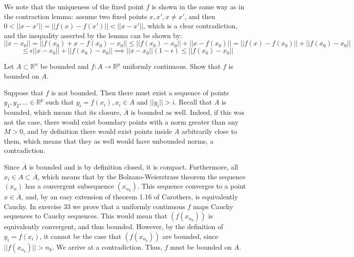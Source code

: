 \begin{solution}
    We note that the uniqueness of the fixed point $f$ is shown in the same way as in the contraction lemma: assume two fixed points $x, x', x \neq x'$, and then $0 < \lvert \lvert x - x' \rvert \rvert = \lvert \lvert f(x) - f(x') \rvert \rvert < \lvert \lvert x - x' \rvert \rvert$, which is a clear contradiction, and the inequality asserted by the lemma can be shown by:
    $$\lvert \lvert x - x_0 \rvert \rvert = \lvert \lvert f(x_0) + x - f(x_0) - x_0 \rvert \rvert \leq \lvert \lvert f(x_0) - x_0 \rvert \rvert + \lvert \lvert x - f(x_0) \rvert \rvert = \lvert \lvert f(x) - f(x_0) \rvert \rvert + \lvert \lvert f(x_0) - x_0 \rvert \rvert$$
    $$\leq \epsilon \lvert \lvert x - x_0 \rvert \rvert + \lvert \lvert f(x_0) - x_0 \rvert \rvert \implies \lvert \lvert x - x_0 \rvert \rvert (1 - \epsilon) \leq \lvert \lvert f(x_0) - x_0 \rvert \rvert$$
\end{solution}

\begin{exercise}{30}
    Let $A \subset \mathbb{R}^n$ be bounded and $f: A \rightarrow \mathbb{R}^p$ uniformly continuous. Show that $f$ is bounded on $A$.
\end{exercise}

\begin{solution}

     Suppose that $f$ is not bounded. Then there must exist a sequence of points $y_1, y_2, \ldots \in \mathbb{R}^p$  such that $y_i = f(x_i), x_i \in A$ and $\lvert \lvert y_i \rvert \rvert > i$. Recall that $A$ is bounded, which means that its closure, $\overline{A}$ is bounded as well. Indeed, if this was not the case, there would exist boundary points with a norm greater than any $M > 0$, and by definition there would exist points inside $A$ arbitrarily close to them, which means that they as well would have unbounded norms, a contradiction.

    Since $\overline{A}$ is bounded and is by definition closed, it is compact. Furthermore, all $x_i \in A \subset \overline{A}$, which means that by the Bolzano-Weierstrass theorem the sequence $(x_n)$ has a convergent subsequence $(x_{n_k})$. This sequence converges to a point $x \in \overline{A}$, and, by an easy extension of theorem 1.16 of Carothers, is equivalently Cauchy. In exercise 33 we prove that a uniformly continuous $f$ maps Cauchy sequences to Cauchy sequences. This would mean that $(f(x_{n_k}))$ is equivalently convergent, and thus bounded. However, by the definition of $y_i = f(x_i)$, it cannot be the case that $(f(x_{n_k}))$ are bounded, since $\lvert \lvert f(x_{n_k}) \rvert \rvert > n_k$. We arrive at a contradiction. Thus, $f$ must be bounded on $A$.
\end{solution}

